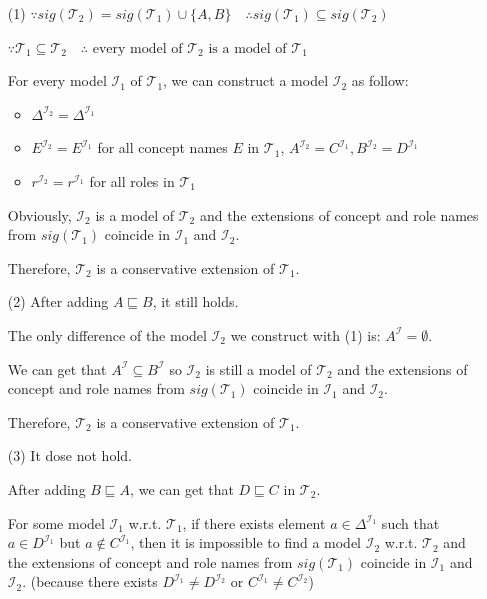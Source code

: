 \documentclass[12pt]{article}
\def \T {\mathcal{T}}
\def \I {\mathcal{I}}
\begin{document}
    \begin{enumerate}
        \item [(1)]
        $\because sig(\T_2) = sig(\T_1) \cup \{A,B\}\quad \therefore sig(\T_1) \subseteq sig(\T_2)$ \par
        $\because \T_1 \subseteq \T_2 \quad \therefore \text{ every model of }\T_2 \text{ is a model of } \T_1$ \par
        For every model $\I_1$ of $\T_1$, we can construct a model $\I_2$ as follow: \par
        \begin{itemize}
            \item $\Delta^{\I_2} = \Delta^{\I_1}$
            \item $E^{\I_2} = E^{\I_1}$ for all concept names $E$ in $\T_1$, $A^{\I_2} = C^{\I_1}, B^{\I_2} = D^{\I_1}$
            \item $r^{\I_2} = r^{\I_1}$ for all roles in $\T_1$
        \end{itemize}
        Obviously, $\I_2$ is a model of $\T_2$ and the extensions of concept and role names from $sig(\T_1)$ coincide in $\I_1$ and
        $\I_2$. \par
        Therefore, $\T_2$ is a conservative extension of $\T_1$.
        \item [(2)]
        After adding $A \sqsubseteq B$, it still holds. \par
        The only difference of the model $\I_2$ we construct with (1) is:
        $A^{\I} = \emptyset$. \par
        We can get that $A^{\I} \subseteq B^{\I}$ so $\I_2$ is still a model of $\T_2$ and the extensions of concept and role names from $sig(\T_1)$ coincide in $\I_1$ and
        $\I_2$. \par
        Therefore, $\T_2$ is a conservative extension of $\T_1$.
        \item [(3)]
        It dose not hold. \par
        After adding $B \sqsubseteq A$, we can get that $D \sqsubseteq C$ in $\T_2$. \par
        For some model $\I_1$ w.r.t. $\T_1$, if there exists element $a \in \Delta^{\I_1}$ such that $a \in D^{\I_1}$ but $a \not\in C ^{\I_1}$, then it is impossible to find a model $\I_2$ w.r.t. $\T_2$ and the extensions of concept and role names from $sig(\T_1)$ coincide in $\I_1$ and $\I_2$. (because there exists $D^{\I_1} \neq D^{\I_2}$ or $C^{\I_1} \neq C^{\I_2}$)
    \end{enumerate}
    
\end{document}
